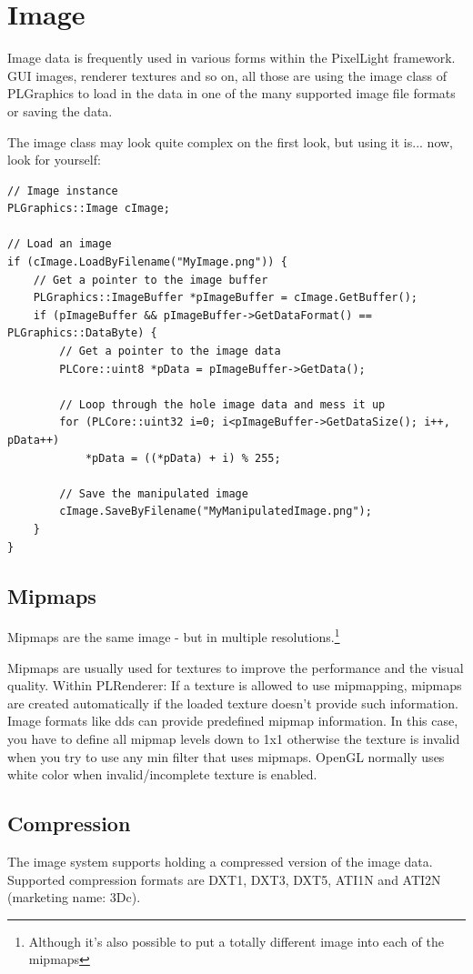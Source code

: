 \section{Image}
Image data is frequently used in various forms within the PixelLight framework. \ac{GUI} images, renderer textures and so on, all those are using the image class of PLGraphics to load in the data in one of the many supported image file formats or saving the data.

The image class may look quite complex on the first look, but using it is... now, look for yourself:

\begin{lstlisting}[caption=Image usage]
// Image instance
PLGraphics::Image cImage;

// Load an image
if (cImage.LoadByFilename("MyImage.png")) {
	// Get a pointer to the image buffer
	PLGraphics::ImageBuffer *pImageBuffer = cImage.GetBuffer();
	if (pImageBuffer && pImageBuffer->GetDataFormat() == PLGraphics::DataByte) {
		// Get a pointer to the image data
		PLCore::uint8 *pData = pImageBuffer->GetData();

		// Loop through the hole image data and mess it up
		for (PLCore::uint32 i=0; i<pImageBuffer->GetDataSize(); i++, pData++)
			*pData = ((*pData) + i) % 255;

		// Save the manipulated image
		cImage.SaveByFilename("MyManipulatedImage.png");
	}
}
\end{lstlisting}




\subsection{Mipmaps}
Mipmaps are the same image - but in multiple resolutions.\footnote{Although it's also possible to put a totally different image into each of the mipmaps}

Mipmaps are usually used for textures to improve the performance and the visual quality.
Within PLRenderer: If a texture is allowed to use mipmapping, mipmaps are created automatically if the loaded texture doesn't provide such information. Image formats like dds can provide predefined mipmap information. In this case, you have to define all mipmap levels down to 1x1 otherwise the texture is invalid when you try to use any min filter that uses mipmaps. OpenGL normally uses white color when invalid/incomplete texture is enabled.




\subsection{Compression}
The image system supports holding a compressed version of the image data. Supported compression formats are DXT1, DXT3, DXT5, ATI1N and ATI2N (marketing name: 3Dc).

